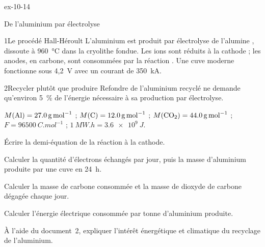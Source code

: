 \begin{blocLivre}{ex-10-14}
\begin{exercice}[3]{De l'aluminium par électrolyse}
\begin{docu}{1}{Le procédé Hall-Héroult}
L'aluminium est produit par électrolyse de l'alumine , dissoute à 960~°C dans la cryolithe fondue. Les ions
 sont réduits à la cathode ; les anodes, en carbone, sont consommées par la réaction
. Une cuve moderne fonctionne sous 4,2~V avec un courant de 350~kA.
\end{docu}
\begin{docu}{2}{Recycler plutôt que produire}
Refondre de l'aluminium recyclé ne demande qu'environ 5~\% de l'énergie nécessaire à sa production par électrolyse.
\end{docu}
\begin{donnees}
$M(\ce{Al})=\qty{27,0}{g.mol^{-1}}$ ; $M(\ce{C})=\qty{12,0}{g.mol^{-1}}$ ; $M(\ce{CO2})=\qty{44,0}{g.mol^{-1}}$ ;
$F=\qty{96500}{C.mol^{-1}}$ ; $\qty{1}{MW.h}=\qty{3,6e9}{J}$.
\end{donnees}
\begin{questions}
\item Écrire la demi-équation de la réaction à la cathode.
\item Calculer la quantité d'électrons échangés par jour, puis la masse d'aluminium produite par une cuve en 24~h.
\item Calculer la masse de carbone consommée et la masse de dioxyde de carbone dégagée chaque jour.
\item \initiative Calculer l'énergie électrique consommée par tonne d'aluminium produite.
\item À l'aide du document~2, expliquer l'intérêt énergétique et climatique du recyclage de l'aluminium.
\end{questions}
\end{exercice}
\end{blocLivre}
